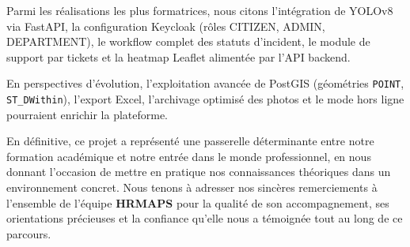 Parmi les réalisations les plus formatrices, nous citons l'intégration de YOLOv8 via FastAPI, la configuration Keycloak (rôles CITIZEN, ADMIN, DEPARTMENT), le workflow complet des statuts d'incident, le module de support par tickets et la heatmap Leaflet alimentée par l'API backend.

En perspectives d'évolution, l'exploitation avancée de PostGIS (géométries \texttt{POINT}, \texttt{ST\_DWithin}), l'export Excel, l'archivage optimisé des photos et le mode hors ligne pourraient enrichir la plateforme.

En définitive, ce projet a représenté une passerelle déterminante entre notre formation académique et notre entrée dans le monde professionnel, en nous donnant l'occasion de mettre en pratique nos connaissances théoriques dans un environnement concret. Nous tenons à adresser nos sincères remerciements à l'ensemble de l'équipe \textbf{HRMAPS} pour la qualité de son accompagnement, ses orientations précieuses et la confiance qu'elle nous a témoignée tout au long de ce parcours.
